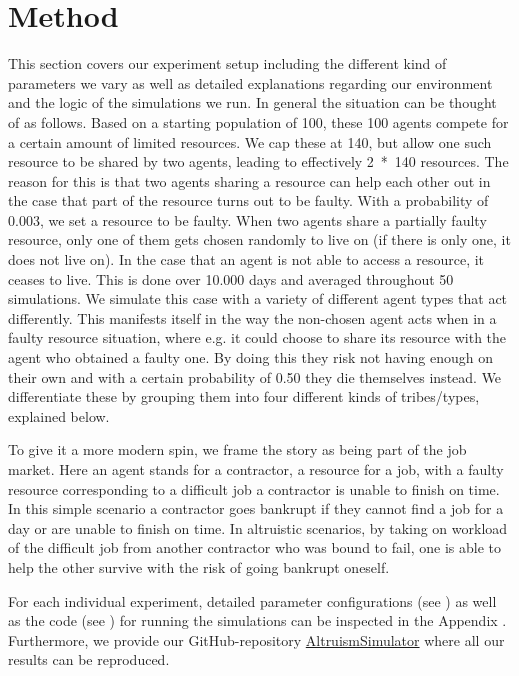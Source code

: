 \documentclass[sigconf]{acmart}
\newcommand{\VNumSimulations}{50\xspace}
\newcommand{\VNumDays}{10.000\xspace}
\newcommand{\VNumPop}{100\xspace}
\newcommand{\VNumTrees}{140\xspace}
\newcommand{\VProbPredator}{0.003\xspace}
\newcommand{\VProbAltruistDies}{0.50\xspace}
\begin{document}
    \section{Method}\label{sec:method}
    This section covers our experiment setup including the different kind of parameters we vary as well as detailed explanations regarding our environment and the logic of the simulations we run.
    In general the situation can be thought of as follows.
    Based on a starting population of \VNumPop, these \VNumPop agents compete for a certain amount of limited resources.
    We cap these at \VNumTrees, but allow one such resource to be shared by two agents, leading to effectively 2~*~\VNumTrees resources.
    The reason for this is that two agents sharing a resource can help each other out in the case that part of the resource turns out to be faulty.
    With a probability of \VProbPredator, we set a resource to be faulty.
    When two agents share a partially faulty resource, only one of them gets chosen randomly to live on (if there is only one, it does not live on).
    In the case that an agent is not able to access a resource, it ceases to live.
    This is done over \VNumDays days and averaged throughout \VNumSimulations simulations.
    We simulate this case with a variety of different agent types that act differently.
    This manifests itself in the way the non-chosen agent acts when in a faulty resource situation, where e.g. it could choose to share its resource with the agent who obtained a faulty one.
    By doing this they risk not having enough on their own and with a certain probability of \VProbAltruistDies they die themselves instead.
    We differentiate these by grouping them into four different kinds of tribes/types, explained below.

    To give it a more modern spin, we frame the story as being part of the job market.
    Here an agent stands for a contractor, a resource for a job, with a faulty resource corresponding to a difficult job a contractor is unable to finish on time.
    In this simple scenario a contractor goes bankrupt if they cannot find a job for a day or are unable to finish on time.
    In altruistic scenarios, by taking on workload of the difficult job from another contractor who was bound to fail, one is able to help the other survive with the risk of going bankrupt oneself.

    For each individual experiment, detailed parameter configurations (see ) as well as the code (see ) for running the simulations can be inspected in the Appendix .
    Furthermore, we provide our GitHub-repository {\color{blue}\href{https://github.com/RafaelSterzinger/AltruismSimulator}{AltruismSimulator}} where all our results can be reproduced.
\end{document}

